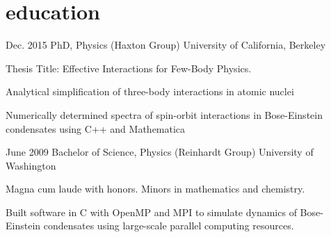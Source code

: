 \documentclass[]{friggeri-cv} %
\let\tempone\itemize
\let\temptwo\enditemize
\renewenvironment{itemize}{\tempone\addtolength{\itemsep}{0.5em}}{\temptwo}
\begin{document}
\begin{entrylist}
{\begin{itemize}
\end{itemize}
}
\end{entrylist}

\vspace{-\baselineskip}
\section{education}

\begin{entrylist}
\entry
{Dec. 2015}
{PhD, {\normalfont  Physics (Haxton Group)}}
{University of California, Berkeley}
{Thesis Title: Effective Interactions for Few-Body Physics. 
\begin{itemize}
\item Analytical simplification of three-body interactions in atomic nuclei 
\item Numerically determined spectra of spin-orbit interactions in Bose-Einstein condensates using C++ and Mathematica
\end{itemize}}
\entry
{June 2009}
{Bachelor of Science, {\normalfont Physics (Reinhardt Group)}}
{University of Washington}
{Magna cum laude with honors. Minors in mathematics and chemistry. 
\begin{itemize}
\item Built software in C with OpenMP and MPI to simulate dynamics of Bose-Einstein condensates using large-scale parallel computing resources.
\end{itemize}}
\end{entrylist}
\end{document}
